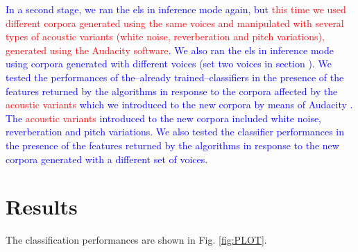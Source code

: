 \documentclass[10pt,letterpaper]{article}
\begin{document}
\pagebreak

\textcolor{blue}{In a second stage, we ran the \glspl{el} in inference mode again, but \textcolor{red}{this time we used different corpora generated using the same voices and manipulated with several types of acoustic variants (white noise, reverberation and pitch variations), generated using the Audacity software}. We also ran the \glspl{el} in inference mode using corpora generated with different voices (set two voices in section ). We tested the performances of the--already trained--classifiers in the presence of the features returned by the algorithms in response to the corpora affected by the \textcolor{red}{acoustic variants} which we introduced to the new corpora by means of Audacity \cite{audacity}. The \textcolor{red}{acoustic variants} introduced to the new corpora included white noise, reverberation and pitch variations. We also tested the classifier performances in the presence of the features returned by the algorithms in response to the new corpora generated with a different set of voices}.











\section*{Results}

The classification performances are shown in Fig. \ref{fig:PLOT}.
\end{document}

